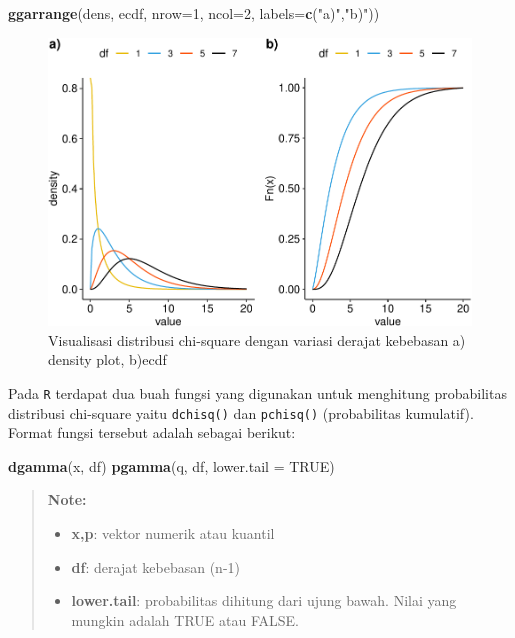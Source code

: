 \documentclass[]{book}
\newenvironment{Shaded}{\begin{snugshade}}{\end{snugshade}}
\newcommand{\KeywordTok}[1]{\textcolor[rgb]{0.13,0.29,0.53}{\textbf{#1}}}
\newcommand{\DataTypeTok}[1]{\textcolor[rgb]{0.13,0.29,0.53}{#1}}
\newcommand{\DecValTok}[1]{\textcolor[rgb]{0.00,0.00,0.81}{#1}}
\newcommand{\StringTok}[1]{\textcolor[rgb]{0.31,0.60,0.02}{#1}}
\newcommand{\OtherTok}[1]{\textcolor[rgb]{0.56,0.35,0.01}{#1}}
\newcommand{\NormalTok}[1]{#1}
\providecommand{\tightlist}{%
  \setlength{\itemsep}{0pt}\setlength{\parskip}{0pt}}
\begin{document}
\begin{Shaded}
\begin{Highlighting}[]
\KeywordTok{ggarrange}\NormalTok{(dens, ecdf, }\DataTypeTok{nrow=}\DecValTok{1}\NormalTok{, }\DataTypeTok{ncol=}\DecValTok{2}\NormalTok{, }\DataTypeTok{labels=}\KeywordTok{c}\NormalTok{(}\StringTok{"a)"}\NormalTok{,}\StringTok{"b)"}\NormalTok{))}
\end{Highlighting}
\end{Shaded}

\begin{figure}

{\centering \includegraphics[width=0.9\linewidth]{EnvStat_files/figure-latex/csqvis-1} 

}

\caption{Visualisasi distribusi chi-square dengan variasi derajat kebebasan a) density plot, b)ecdf}\label{fig:csqvis}
\end{figure}

Pada \texttt{R} terdapat dua buah fungsi yang digunakan untuk menghitung
probabilitas distribusi chi-square yaitu \texttt{dchisq()} dan
\texttt{pchisq()} (probabilitas kumulatif). Format fungsi tersebut
adalah sebagai berikut:

\begin{Shaded}
\begin{Highlighting}[]
\KeywordTok{dgamma}\NormalTok{(x, df)}
\KeywordTok{pgamma}\NormalTok{(q, df, }\DataTypeTok{lower.tail =} \OtherTok{TRUE}\NormalTok{)}
\end{Highlighting}
\end{Shaded}

\begin{quote}
\textbf{Note: }

\begin{itemize}
\tightlist
\item
  \textbf{x,p}: vektor numerik atau kuantil
\item
  \textbf{df}: derajat kebebasan (n-1)
\item
  \textbf{lower.tail}: probabilitas dihitung dari ujung bawah. Nilai
  yang mungkin adalah TRUE atau FALSE.
\end{itemize}
\end{quote}
\end{document}
